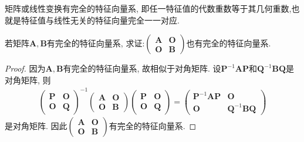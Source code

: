 \documentclass[../../main.tex]{subfiles}
\begin{document}
矩阵或线性变换有完全的特征向量系, 即任一特征值的代数重数等于其几何重数,也就是特征值与线性无关的特征向量完全一一对应.

\begin{proposition}\label{example-6.38}
若矩阵\(\boldsymbol{A},\boldsymbol{B}\)有完全的特征向量系, 求证:\(\begin{pmatrix}
\boldsymbol{A}&\boldsymbol{O}\\
\boldsymbol{O}&\boldsymbol{B}
\end{pmatrix}\)也有完全的特征向量系.
\end{proposition}
\begin{proof}
因为\(\boldsymbol{A},\boldsymbol{B}\)有完全的特征向量系, 故相似于对角矩阵. 设\(\boldsymbol{P}^{-1}\boldsymbol{AP}\)和\(\boldsymbol{Q}^{-1}\boldsymbol{BQ}\)是对角矩阵, 则
\begin{align*}
\begin{pmatrix}
\boldsymbol{P}&\boldsymbol{O}\\
\boldsymbol{O}&\boldsymbol{Q}
\end{pmatrix}^{-1}
\begin{pmatrix}
\boldsymbol{A}&\boldsymbol{O}\\
\boldsymbol{O}&\boldsymbol{B}
\end{pmatrix}
\begin{pmatrix}
\boldsymbol{P}&\boldsymbol{O}\\
\boldsymbol{O}&\boldsymbol{Q}
\end{pmatrix}
=
\begin{pmatrix}
\boldsymbol{P}^{-1}\boldsymbol{AP}&\boldsymbol{O}\\
\boldsymbol{O}&\boldsymbol{Q}^{-1}\boldsymbol{BQ}
\end{pmatrix}
\end{align*}
是对角矩阵. 因此\(\begin{pmatrix}
\boldsymbol{A}&\boldsymbol{O}\\
\boldsymbol{O}&\boldsymbol{B}
\end{pmatrix}\)有完全的特征向量系. 
\end{proof}
\end{document}
